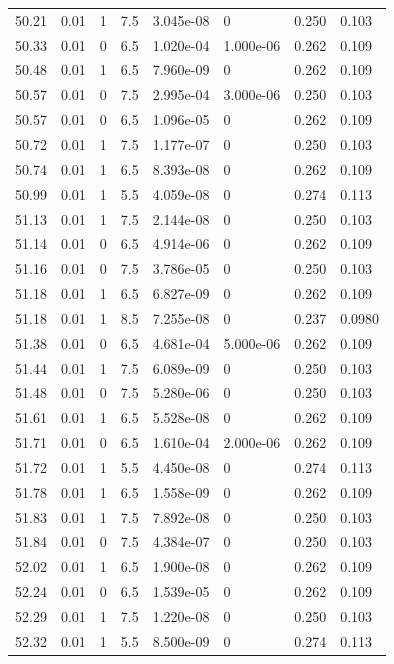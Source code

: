 \documentclass[preview]{standalone}
\begin{document}
{{{{{{{{{{{{{{{{{\begin{tabular}{L{1.2cm}C{1.2cm} C{0.3cm}C{0.5cm} C{1.4cm}C{1.4cm} C{1.4cm}C{1.4cm}}
  50.21  &  0.01  & 1     & 7.5 &  3.045e-08  & 0  & 0.250 &  0.103   \\ 
  50.33  &  0.01  & 0     & 6.5 &  1.020e-04  & 1.000e-06  & 0.262 &  0.109   \\ 
  50.48  &  0.01  & 1     & 6.5 &  7.960e-09  & 0  & 0.262 &  0.109   \\ 
  50.57  &  0.01  & 0     & 7.5 &  2.995e-04  & 3.000e-06  & 0.250 &  0.103   \\ 
  50.57  &  0.01  & 0     & 6.5 &  1.096e-05  & 0  & 0.262 &  0.109   \\ 
  50.72  &  0.01  & 1     & 7.5 &  1.177e-07  & 0  & 0.250 &  0.103   \\ 
  50.74  &  0.01  & 1     & 6.5 &  8.393e-08  & 0  & 0.262 &  0.109   \\ 
  50.99  &  0.01  & 1     & 5.5 &  4.059e-08  & 0  & 0.274 &  0.113   \\ 
  51.13  &  0.01  & 1     & 7.5 &  2.144e-08  & 0  & 0.250 &  0.103   \\ 
  51.14  &  0.01  & 0     & 6.5 &  4.914e-06  & 0  & 0.262 &  0.109   \\ 
  51.16  &  0.01  & 0     & 7.5 &  3.786e-05  & 0  & 0.250 &  0.103   \\ 
  51.18  &  0.01  & 1     & 6.5 &  6.827e-09  & 0  & 0.262 &  0.109   \\ 
  51.18  &  0.01  & 1     & 8.5 &  7.255e-08  & 0  & 0.237 &  0.0980   \\ 
  51.38  &  0.01  & 0     & 6.5 &  4.681e-04  & 5.000e-06  & 0.262 &  0.109   \\ 
  51.44  &  0.01  & 1     & 7.5 &  6.089e-09  & 0  & 0.250 &  0.103   \\ 
  51.48  &  0.01  & 0     & 7.5 &  5.280e-06  & 0  & 0.250 &  0.103   \\ 
  51.61  &  0.01  & 1     & 6.5 &  5.528e-08  & 0  & 0.262 &  0.109   \\ 
  51.71  &  0.01  & 0     & 6.5 &  1.610e-04  & 2.000e-06  & 0.262 &  0.109   \\ 
  51.72  &  0.01  & 1     & 5.5 &  4.450e-08  & 0  & 0.274 &  0.113   \\ 
  51.78  &  0.01  & 1     & 6.5 &  1.558e-09  & 0  & 0.262 &  0.109   \\ 
  51.83  &  0.01  & 1     & 7.5 &  7.892e-08  & 0  & 0.250 &  0.103   \\ 
  51.84  &  0.01  & 0     & 7.5 &  4.384e-07  & 0  & 0.250 &  0.103   \\ 
  52.02  &  0.01  & 1     & 6.5 &  1.900e-08  & 0  & 0.262 &  0.109   \\ 
  52.24  &  0.01  & 0     & 6.5 &  1.539e-05  & 0  & 0.262 &  0.109   \\ 
  52.29  &  0.01  & 1     & 7.5 &  1.220e-08  & 0  & 0.250 &  0.103   \\ 
  52.32  &  0.01  & 1     & 5.5 &  8.500e-09  & 0  & 0.274 &  0.113   \\ 
\hline 
\end{tabular} 

}}}}}}}}}}}}}}}}}
\end{document}
